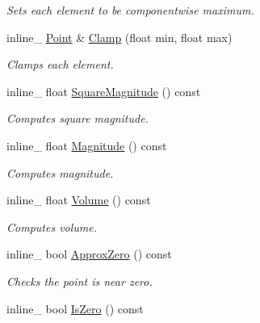 \begin{DoxyCompactItemize}
\begin{DoxyCompactList}\small\item\em Sets each element to be componentwise maximum. \end{DoxyCompactList}\item 
inline\+\_\+ \hyperlink{classPoint}{Point} \& \hyperlink{classPoint_ae8d6791fe6b0aee7493de222b6d81b95}{Clamp} (float min, float max)\hypertarget{classPoint_ae8d6791fe6b0aee7493de222b6d81b95}{}\label{classPoint_ae8d6791fe6b0aee7493de222b6d81b95}

\begin{DoxyCompactList}\small\item\em Clamps each element. \end{DoxyCompactList}\item 
inline\+\_\+ float \hyperlink{classPoint_a3abb46bdf87fb205b0731eda3ec56fff}{Square\+Magnitude} () const \hypertarget{classPoint_a3abb46bdf87fb205b0731eda3ec56fff}{}\label{classPoint_a3abb46bdf87fb205b0731eda3ec56fff}

\begin{DoxyCompactList}\small\item\em Computes square magnitude. \end{DoxyCompactList}\item 
inline\+\_\+ float \hyperlink{classPoint_aca9186d03219113022d562ff7c7c5ea9}{Magnitude} () const \hypertarget{classPoint_aca9186d03219113022d562ff7c7c5ea9}{}\label{classPoint_aca9186d03219113022d562ff7c7c5ea9}

\begin{DoxyCompactList}\small\item\em Computes magnitude. \end{DoxyCompactList}\item 
inline\+\_\+ float \hyperlink{classPoint_ab9c444ad1d9d30ccc7c7c9c4a8437f27}{Volume} () const \hypertarget{classPoint_ab9c444ad1d9d30ccc7c7c9c4a8437f27}{}\label{classPoint_ab9c444ad1d9d30ccc7c7c9c4a8437f27}

\begin{DoxyCompactList}\small\item\em Computes volume. \end{DoxyCompactList}\item 
inline\+\_\+ bool \hyperlink{classPoint_a484b9d912521bc2a322115d476dab955}{Approx\+Zero} () const \hypertarget{classPoint_a484b9d912521bc2a322115d476dab955}{}\label{classPoint_a484b9d912521bc2a322115d476dab955}

\begin{DoxyCompactList}\small\item\em Checks the point is near zero. \end{DoxyCompactList}\item 
inline\+\_\+ bool \hyperlink{classPoint_a67a2c81fd35af8a9af539f4da52a4884}{Is\+Zero} () const \hypertarget{classPoint_a67a2c81fd35af8a9af539f4da52a4884}{}\label{classPoint_a67a2c81fd35af8a9af539f4da52a4884}


\end{DoxyCompactItemize}
